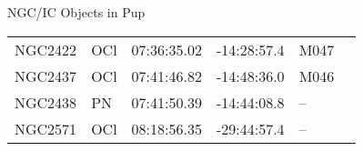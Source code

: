 \begin{block}{NGC/IC Objects in Pup}
  \centering
  \begin{tabularx}{\textwidth}{llrrll} 
    NGC2422 & OCl & 07:36:35.02 & -14:28:57.4  & M047 \\ 
    NGC2437 & OCl & 07:41:46.82 & -14:48:36.0  & M046 \\ 
    NGC2438 & PN & 07:41:50.39 & -14:44:08.8  & -- \\ 
    NGC2571 & OCl & 08:18:56.35 & -29:44:57.4  & -- \\ 
  \end{tabularx}
\end{block}